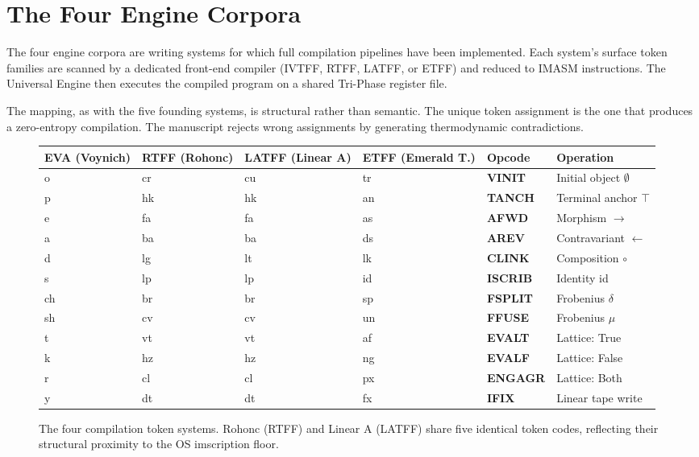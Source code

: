\documentclass[12pt,a4paper]{article}
\begin{document}
\section{The Four Engine Corpora}
\label{sec:engines}

The four engine corpora are writing systems for which full compilation pipelines have been implemented. Each system's surface token families are scanned by a dedicated front-end compiler (IVTFF, RTFF, LATFF, or ETFF) and reduced to IMASM instructions. The Universal Engine then executes the compiled program on a shared Tri-Phase register file.

The mapping, as with the five founding systems, is structural rather than semantic. The unique token assignment is the one that produces a zero-entropy compilation. The manuscript rejects wrong assignments by generating thermodynamic contradictions.

\begin{figure}[htbp]
\centering
\small
\begin{tabular}{>{\ttfamily}l >{\ttfamily}l >{\ttfamily}l >{\ttfamily}l >{\bfseries}l l}
\toprule
\normalfont\textbf{EVA (Voynich)} & \normalfont\textbf{RTFF (Rohonc)} & \normalfont\textbf{LATFF (Linear A)} & \normalfont\textbf{ETFF (Emerald T.)} & \normalfont\textbf{Opcode} & \normalfont\textbf{Operation} \\
\midrule
o  & cr & cu & tr & VINIT  & Initial object $\emptyset$ \\
p  & hk & hk & an & TANCH  & Terminal anchor $\top$ \\
e  & fa & fa & as & AFWD   & Morphism $\to$ \\
a  & ba & ba & ds & AREV   & Contravariant $\leftarrow$ \\
d  & lg & lt & lk & CLINK  & Composition $\circ$ \\
s  & lp & lp & id & ISCRIB & Identity id \\
ch & br & br & sp & FSPLIT & Frobenius $\delta$ \\
sh & cv & cv & un & FFUSE  & Frobenius $\mu$ \\
t  & vt & vt & af & EVALT  & Lattice: True \\
k  & hz & hz & ng & EVALF  & Lattice: False \\
r  & cl & cl & px & ENGAGR & Lattice: Both \\
y  & dt & dt & fx & IFIX   & Linear tape write \\
\bottomrule
\end{tabular}
\caption{The four compilation token systems. Rohonc (RTFF) and Linear A (LATFF) share five identical token codes, reflecting their structural proximity to the OS imscription floor.}
\label{fig:tokentable}
\end{figure}
\end{document}
